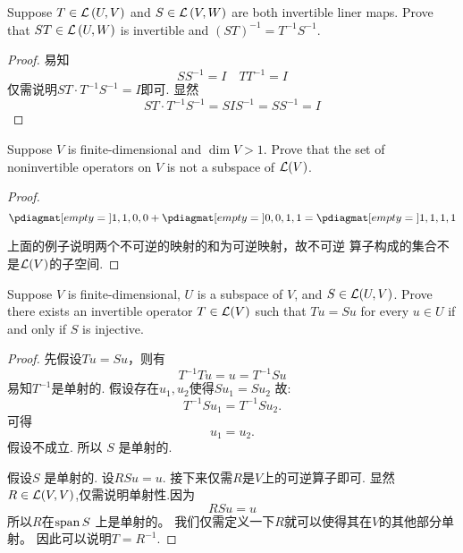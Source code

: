 

\begin{problem}{1}
Suppose $T\in\mathcal{L}\left( U,V \right) $ and
$S\in\mathcal{L}\left( V,W \right) $ are both invertible
liner maps. Prove that $ST\in\mathcal{L}\left( U,W \right) $
is invertible and $\left( ST \right)^{-1}=T^{-1}S^{-1}$.
\end{problem}


\begin{proof}
	易知\[
		SS^{-1}=I \quad TT^{-1}=I
	\]
	仅需说明$ST\cdot T^{-1}S^{-1}=I$即可.
	显然
	\[
		ST\cdot T^{-1}S^{-1}=SIS^{-1}=SS^{-1}=I
	\]
\end{proof}

\begin{problem}{2}
Suppose $V$ is finite-dimensional and $\dim V > 1$.
Prove that the set of noninvertible operators on $V$
is not a subspace of $\mathcal{L}(V)$.
\end{problem}

\begin{proof}
	\[
		\pdiagmat [ empty = {} ]
		{ 1, 1, 0, 0 } +\pdiagmat [ empty = {} ]{ 0, 0, 1, 1 } =\pdiagmat [ empty = {} ]{ 1, 1, 1, 1 }
	\]

	上面的例子说明两个不可逆的映射的和为可逆映射，故不可逆
	算子构成的集合不是$\mathcal{L}(V)$的子空间.
\end{proof}
\begin{problem}{3}
Suppose $V$ is finite-dimensional, $U$ is a subspace
of $V$, and $S\in\mathcal{L}(U,V)$. Prove there exists an
invertible operator $T\in\mathcal{L}(V)$ such that $Tu = Su$
for every $u\in U$ if and only if $S$ is injective.
\end{problem}

\begin{proof}
	先假设$Tu = Su$，则有
	\[
		T^{-1}Tu =u =T^{-1}Su
	\]
	易知$T^{-1}$是单射的.
	假设存在$u_1,u_2$使得$Su_1=Su_2$
	故:\[
		T^{-1}Su_1 =T^{-1}Su_2.
	\]
	可得
	\[
		u_1 = u_2.
	\]
	假设不成立. 所以 $S$ 是单射的.

	假设$S$ 是单射的. 设$RSu=u$.
	接下来仅需$R$是$V$上的可逆算子即可.
	显然$R\in\mathcal{L}(V,V)$,仅需说明单射性.因为
	\[
		RSu=u
	\]
	所以$R$在$\operatorname{span} S $ 上是单射的。
	我们仅需定义一下$R$就可以使得其在$V$的其他部分单射。
	因此可以说明$T=R^{-1}$.
\end{proof}

